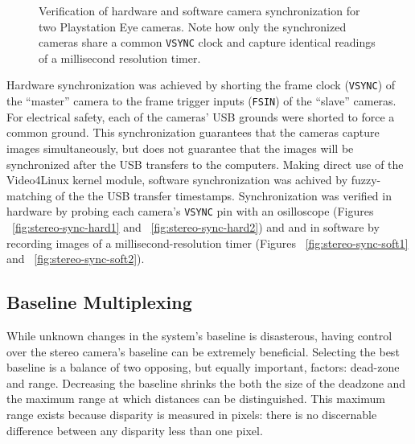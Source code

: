 \documentclass[11pt,twocolumn]{article}
\begin{document}
\begin{figure*}
	\centering
	\caption{
		Verification of hardware and software camera synchronization for two
		Playstation Eye cameras. Note how only the synchronized cameras share a
		common \texttt{VSYNC} clock and capture identical readings of a
		millisecond resolution timer.
	}
	\label{fig:stereo-sync}
\end{figure*}

Hardware synchronization was achieved by  shorting the frame clock
(\texttt{VSYNC}) of the ``master'' camera to the frame trigger inputs
(\texttt{FSIN}) of the ``slave'' cameras. For electrical safety, each of the
cameras' USB grounds were shorted to force a common ground. This
synchronization guarantees that the cameras capture images simultaneously, but
does not guarantee that the images will be synchronized after the USB transfers
to the computers. Making direct use of the Video4Linux kernel module, software
synchronization was achived by fuzzy-matching of the the USB transfer
timestamps. Synchronization was verified in hardware by probing each camera's
\texttt{VSYNC} pin with an osilloscope (Figures ~\ref{fig:stereo-sync-hard1}
and ~\ref{fig:stereo-sync-hard2}) and and in software by recording images of a
millisecond-resolution timer (Figures ~\ref{fig:stereo-sync-soft1} and
~\ref{fig:stereo-sync-soft2}).

\subsection{Baseline Multiplexing}
\label{sec:stereo-mux}
While unknown changes in the system's baseline is disasterous, having control
over the stereo camera's baseline can be extremely beneficial. Selecting the
best baseline is a balance of two opposing, but equally important, factors:
dead-zone and range. Decreasing the baseline shrinks the both the size of the
deadzone and the maximum range at which distances can be distinguished. This
maximum range exists because disparity is measured in pixels: there is no
discernable difference between any disparity less than one pixel.
\end{document}

